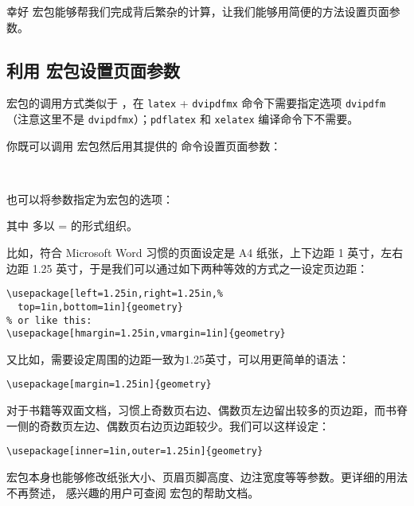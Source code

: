 幸好  宏包能够帮我们完成背后繁杂的计算，让我们能够用简便的方法设置页面参数。

\subsection{利用  宏包设置页面参数}\label{subsec:geometry}

 宏包的调用方式类似于 ，在 \texttt{latex} + \texttt{dvipdfmx} 命令下需要指定选项 \texttt{dvipdfm}
（注意这里不是 \texttt{dvipdfmx}）；\texttt{pdflatex} 和 \texttt{xelatex} 编译命令下不需要。

你既可以调用  宏包然后用其提供的  命令设置页面参数：
\begin{command}
 \\
\end{command}
也可以将参数指定为宏包的选项：
\begin{command}
\end{command}

其中  多以 = 的形式组织。

比如，符合 Microsoft Word 习惯的页面设定是 A4 纸张，上下边距 1 英寸，左右边距 1.25 英寸，于是我们可以通过如下两种等效的方式之一设定页边距：
\begin{verbatim}
\usepackage[left=1.25in,right=1.25in,%
  top=1in,bottom=1in]{geometry}
% or like this:
\usepackage[hmargin=1.25in,vmargin=1in]{geometry}
\end{verbatim}

又比如，需要设定周围的边距一致为1.25英寸，可以用更简单的语法：
\begin{verbatim}
\usepackage[margin=1.25in]{geometry}
\end{verbatim}

对于书籍等双面文档，习惯上奇数页右边、偶数页左边留出较多的页边距，而书脊一侧的奇数页左边、偶数页右边页边距较少。我们可以这样设定：
\begin{verbatim}
\usepackage[inner=1in,outer=1.25in]{geometry}
\end{verbatim}

 宏包本身也能够修改纸张大小、页眉页脚高度、边注宽度等等参数。更详细的用法不再赘述，
感兴趣的用户可查阅  宏包的帮助文档。

